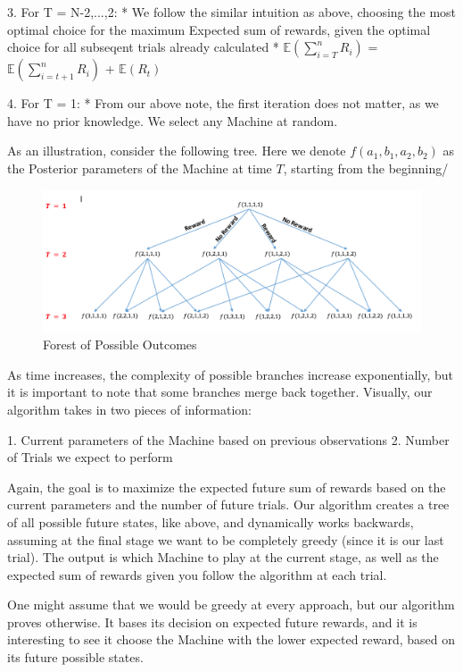 \documentclass{article}
\begin{document}
3. For T = N-2,...,2:
    * We follow the similar intuition as above, choosing the most optimal choice for the maximum Expected sum of rewards, given the optimal choice for all subseqent trials already calculated
    * $\mathbb{E}(\displaystyle\sum_{i=T}^{n} R_i)$ = $\mathbb{E}(\displaystyle\sum_{i=t+1}^{n} R_i)$ + $\mathbb{E}(R_t)$
    
4. For T = 1:
    * From our above note, the first iteration does not matter, as we have no prior knowledge. We select any Machine at random.

As an illustration, consider the following tree. Here we denote $f(a_1, b_1, a_2, b_2)$ as the Posterior parameters of the Machine at time $T$, starting from the beginning/

\begin{figure}[H]
\centering
\includegraphics[scale=0.5]{Dynamic_Programming_Tree.png}
\caption{Forest of Possible Outcomes}
\end{figure}

As time increases, the complexity of possible branches increase exponentially, but it is important to note that some branches merge back together. Visually, our algorithm takes in two pieces of information:

1. Current parameters of the Machine based on previous observations
2. Number of Trials we expect to perform

Again, the goal is to maximize the expected future sum of rewards based on the current parameters and the number of future trials. Our algorithm creates a tree of all possible future states, like above, and dynamically works backwards, assuming at the final stage we want to be completely greedy (since it is our last trial). The output is which Machine to play at the current stage, as well as the expected sum of rewards given you follow the algorithm at each trial.

One might assume that we would be greedy at every approach, but our algorithm proves otherwise. It bases its decision on expected future rewards, and it is interesting to see it choose the Machine with the lower expected reward, based on its future possible states.
\end{document}
